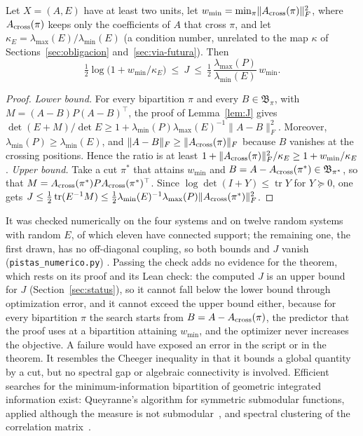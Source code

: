 \begin{theorem}\label{thm:cheeger}
Let $X=(A,E)$ have at least two units, let $w_{\min}=\min_\pi\lVert A_{\rm cross}(\pi)\rVert_F^2$, where $A_{\rm cross}(\pi)$ keeps only the coefficients of $A$ that cross $\pi$, and let $\kappa_E=\lambda_{\max}(E)/\lambda_{\min}(E)$ (a condition number, unrelated to the map $\kappa$ of Sections~\ref{sec:obligacion} and~\ref{sec:via-futura}). Then
\begin{equation}
\tfrac12\log\bigl(1+w_{\min}/\kappa_E\bigr)\ \le\ J\ \le\ \tfrac12\,\frac{\lambda_{\max}(P)}{\lambda_{\min}(E)}\,w_{\min}.
\end{equation}
\end{theorem}
\begin{proof}
\emph{Lower bound.} For every bipartition $\pi$ and every $B\in\mathfrak B_\pi$, with $M=(A-B)P(A-B)^\top$, the proof of Lemma~\ref{lem:J} gives $\det(E+M)/\det E\ge1+\lambda_{\min}(P)\lambda_{\max}(E)^{-1}\lVert A-B\rVert_F^2$. Moreover, $\lambda_{\min}(P)\ge\lambda_{\min}(E)$, and $\lVert A-B\rVert_F\ge\lVert A_{\rm cross}(\pi)\rVert_F$ because $B$ vanishes at the crossing positions. Hence the ratio is at least $1+\lVert A_{\rm cross}(\pi)\rVert_F^2/\kappa_E\ge1+w_{\min}/\kappa_E$.
\emph{Upper bound.} Take a cut $\pi^*$ that attains $w_{\min}$ and $B=A-A_{\rm cross}(\pi^*)\in\mathfrak B_{\pi^*}$, so that $M=A_{\rm cross}(\pi^*)PA_{\rm cross}(\pi^*)^\top$. Since $\log\det(I+Y)\le\operatorname{tr}Y$ for $Y\succeq0$, one gets $J\le\tfrac12\operatorname{tr}(E^{-1}M)\le\tfrac12\lambda_{\min}(E)^{-1}\lambda_{\max}(P)\lVert A_{\rm cross}(\pi^*)\rVert_F^2$.
\end{proof}
It was checked numerically on the four systems and on twelve random systems with random $E$, of which eleven have connected support; the remaining one, the first drawn, has no off-diagonal coupling, so both bounds and $J$ vanish (\texttt{pistas\_numerico.py}) \stN. Passing the check adds no evidence for the theorem, which rests on its proof and its Lean check: the computed $J$ is an upper bound for $J$ (Section~\ref{sec:status}), so it cannot fall below the lower bound through optimization error, and it cannot exceed the upper bound either, because for every bipartition $\pi$ the search starts from $B=A-A_{\rm cross}(\pi)$, the predictor that the proof uses at a bipartition attaining $w_{\min}$, and the optimizer never increases the objective. A failure would have exposed an error in the script or in the theorem. It resembles the Cheeger inequality in that it bounds a global quantity by a cut, but no spectral gap or algebraic connectivity is involved. Efficient searches for the minimum-information bipartition of geometric integrated information exist: Queyranne's algorithm for symmetric submodular functions, applied although the measure is not submodular~\cite{Kitazono2018}, and spectral clustering of the correlation matrix~\cite{TokerSommer2019}.

